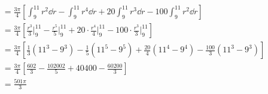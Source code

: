 \documentclass[letterpaper,12pt]{article}
\begin{document}
\begin{enumerate}
\begin{align*}
      &= \frac{3\pi}{4} \left[\int_{9}^{11} r^2 \dd{r} - \int_{9}^{11} r^4 \dd{r} + 20\int_{9}^{11} r^3 \dd{r} - 100\int_{9}^{11} r^2 \dd{r}\right] \\
      &= \frac{3\pi}{4} \left[\frac{r^3}{3} \bigg\rvert_{9}^{11} - \frac{r^5}{5} \bigg\rvert_{9}^{11} + 20 \cdot \frac{r^4}{4} \bigg\rvert_{9}^{11} - 100 \cdot \frac{r^3}{3} \bigg\rvert_{9}^{11}\right] \\
      &= \frac{3\pi}{4} \left[\frac{1}{3}(11^3 - 9^3) - \frac{1}{5}(11^5 - 9^5) + \frac{20}{4}(11^4 - 9^4) - \frac{100}{3}(11^3 - 9^3)\right] \\
      &= \frac{3\pi}{4} \left[\frac{602}{3} - \frac{102002}{5} + 40400 - \frac{60200}{3}\right] \\
      &= \frac{501\pi}{3}
    \end{align*}
\end{enumerate}
\end{document}

